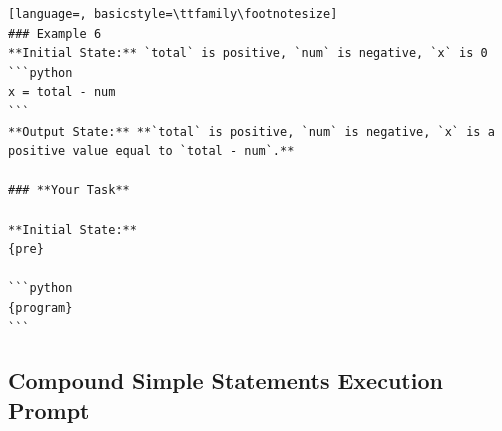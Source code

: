 \documentclass[sigconf]{acmart}
\begin{document}
\begin{tcolorbox}[ colback=gray!10, colframe=black, arc=5pt]
\begin{lstlisting}[language=, basicstyle=\ttfamily\footnotesize]
### Example 6  
**Initial State:** `total` is positive, `num` is negative, `x` is 0  
```python
x = total - num
```
**Output State:** **`total` is positive, `num` is negative, `x` is a positive value equal to `total - num`.**

### **Your Task**

**Initial State:**  
{pre}

```python
{program}
```

\end{lstlisting}
\end{tcolorbox}


\subsection{Compound Simple Statements Execution Prompt}
\label{compund statement prompt}
\end{document}
